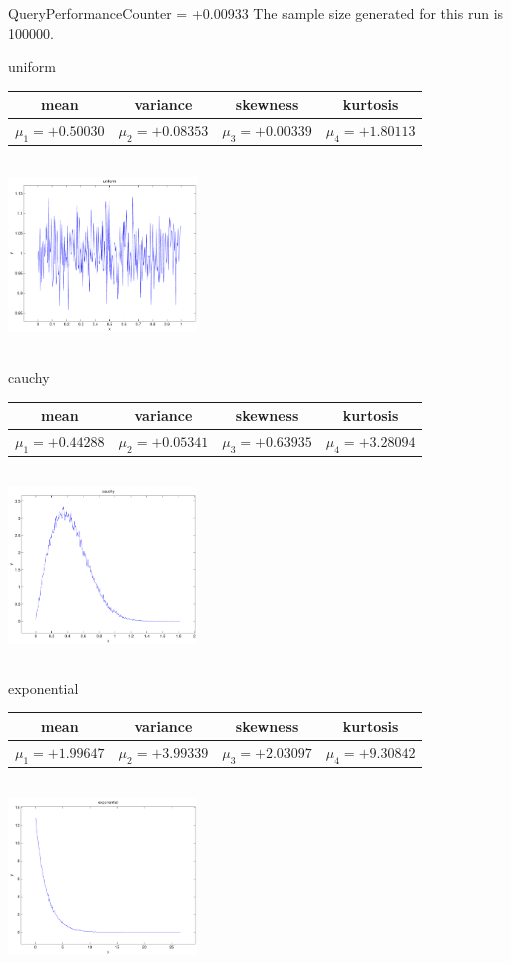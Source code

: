\documentclass[9pt]{article}
\theoremstyle{plain}
\theoremstyle{definition}
\theoremstyle{remark}
\numberwithin{equation}{section}
\begin{document}
QueryPerformanceCounter  =  +0.00933
The sample size generated for this run is 100000.

\newpage
uniform \begin{tabular}{|c|c|c|c|}  mean & variance & skewness & kurtosis \\  \hline
$\mu_1 = +0.50030$ & $\mu_2 = +0.08353$ & $\mu_3 = +0.00339$ & $\mu_4 =+1.80113$ \\
\end{tabular}

\includegraphics[width=5cm,height=5cm]{uniform.pdf}

cauchy \begin{tabular}{|c|c|c|c|}  mean & variance & skewness & kurtosis \\  \hline
$\mu_1 = +0.44288$ & $\mu_2 = +0.05341$ & $\mu_3 = +0.63935$ & $\mu_4 =+3.28094$ \\
\end{tabular}

\includegraphics[width=5cm,height=5cm]{cauchy.pdf}

exponential \begin{tabular}{|c|c|c|c|}  mean & variance & skewness & kurtosis \\  \hline
$\mu_1 = +1.99647$ & $\mu_2 = +3.99339$ & $\mu_3 = +2.03097$ & $\mu_4 =+9.30842$ \\
\end{tabular}

\includegraphics[width=5cm,height=5cm]{exponential.pdf}
\end{document}
